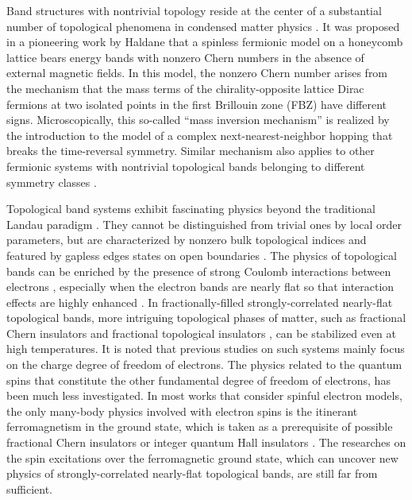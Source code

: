 \documentclass[amsmath,superscriptaddress,showpacs,aps,prl,twocolumn]{revtex4-1}
\begin{document}
\par Band structures with nontrivial topology reside at the center of a substantial number of topological phenomena in condensed matter physics \cite{Hasan_RMP2010,Qi_RMP2011,Bansil_RMP2016}. It was proposed in a pioneering work by Haldane \cite{Haldane_PRL1988} that a spinless fermionic model on a honeycomb lattice bears energy bands with nonzero Chern numbers \cite{Thouless_PRL1982,Simon_PRL1983} in the absence of external magnetic fields. In this model, the nonzero Chern number arises from the mechanism that the mass terms of the chirality-opposite lattice Dirac fermions at two isolated points in the first Brillouin zone (FBZ) have different signs. Microscopically, this so-called ``mass inversion mechanism'' is realized by the introduction to the model of a complex next-nearest-neighbor hopping that breaks the time-reversal symmetry. Similar mechanism also applies to other fermionic systems with nontrivial topological bands belonging to different symmetry classes \cite{Kane_PRL2005}.

\par Topological band systems exhibit fascinating physics beyond the traditional Landau paradigm \cite{Chiu_RMP2016,Zeng_B2019}. They cannot be distinguished from trivial ones by local order parameters, but are characterized by nonzero bulk topological indices and featured by gapless edges states on open boundaries \cite{Laughlin_PRB1981,Halperin_PRB1982,Kane_PRL2005a,Bernevig_S2006,Yu_PRL2011,Li_PRB2016,Liu_NJP2017}. The physics of topological bands can be enriched by the presence of strong Coulomb interactions between electrons \cite{Hohenadler_JPCM2013,Wen_RMP2017,Rachel_RPP2018}, especially when the electron bands are nearly flat so that interaction effects are highly enhanced \cite{Neupert_PS2015}. In fractionally-filled strongly-correlated nearly-flat topological bands, more intriguing topological phases of matter, such as fractional Chern insulators \cite{Tang_PRL2011,Wang_PRB2011,Sun_PRL2011,Wang_PRL2011,Neupert_PRL2011,Sheng_NC2011,Regnault_PRX2011} and fractional topological insulators \cite{Neupert_PRB2011}, can be stabilized even at high temperatures. It is noted that previous studies on such systems mainly focus on the charge degree of freedom of electrons. The physics related to the quantum spins that constitute the other fundamental degree of freedom of electrons, has been much less investigated. In most works that consider spinful electron models, the only many-body physics involved with electron spins is the itinerant ferromagnetism \cite{Tasaki_PRL1992,Mielke_PLA1993,Mielke_CMP1993} in the ground state, which is taken as a prerequisite of possible fractional Chern insulators \cite{Tang_PRL2011,Wang_PRB2011,Sun_PRL2011} or integer quantum Hall insulators \cite{Neupert_PRL2012}. The researches \cite{Doretto_PRB2015,Su_PRB2019} on the spin excitations over the ferromagnetic ground state, which can uncover new physics of strongly-correlated nearly-flat topological bands, are still far from sufficient.
\end{document}

